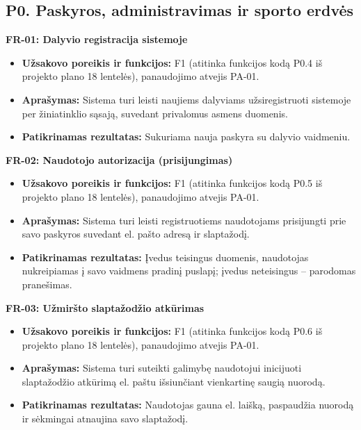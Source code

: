 \subsection{P0. Paskyros, administravimas ir sporto erdvės}

\vspace{0.3cm}
\noindent\textbf{FR-01: Dalyvio registracija sistemoje}
\begin{itemize}
    \item \textbf{Užsakovo poreikis ir funkcijos:} F1 (atitinka funkcijos kodą P0.4 iš projekto plano 18 lentelės), panaudojimo atvejis PA-01.
    \item \textbf{Aprašymas:} Sistema turi leisti naujiems dalyviams užsiregistruoti sistemoje per žiniatinklio sąsają, suvedant privalomus asmens duomenis.
    \item \textbf{Patikrinamas rezultatas:} Sukuriama nauja paskyra su dalyvio vaidmeniu.
\end{itemize}

\vspace{0.3cm}
\noindent\textbf{FR-02: Naudotojo autorizacija (prisijungimas)}
\begin{itemize}
    \item \textbf{Užsakovo poreikis ir funkcijos:} F1 (atitinka funkcijos kodą P0.5 iš projekto plano 18 lentelės), panaudojimo atvejis PA-01.
    \item \textbf{Aprašymas:} Sistema turi leisti registruotiems naudotojams prisijungti prie savo paskyros suvedant el. pašto adresą ir slaptažodį.
    \item \textbf{Patikrinamas rezultatas:} Įvedus teisingus duomenis, naudotojas nukreipiamas į savo vaidmens pradinį puslapį; įvedus neteisingus – parodomas pranešimas.
\end{itemize}

\vspace{0.3cm}
\noindent\textbf{FR-03: Užmiršto slaptažodžio atkūrimas}
\begin{itemize}
    \item \textbf{Užsakovo poreikis ir funkcijos:} F1 (atitinka funkcijos kodą P0.6 iš projekto plano 18 lentelės), panaudojimo atvejis PA-01.
    \item \textbf{Aprašymas:} Sistema turi suteikti galimybę naudotojui inicijuoti slaptažodžio atkūrimą el. paštu išsiunčiant vienkartinę saugią nuorodą.
    \item \textbf{Patikrinamas rezultatas:} Naudotojas gauna el. laišką, paspaudžia nuorodą ir sėkmingai atnaujina savo slaptažodį.
\end{itemize}

